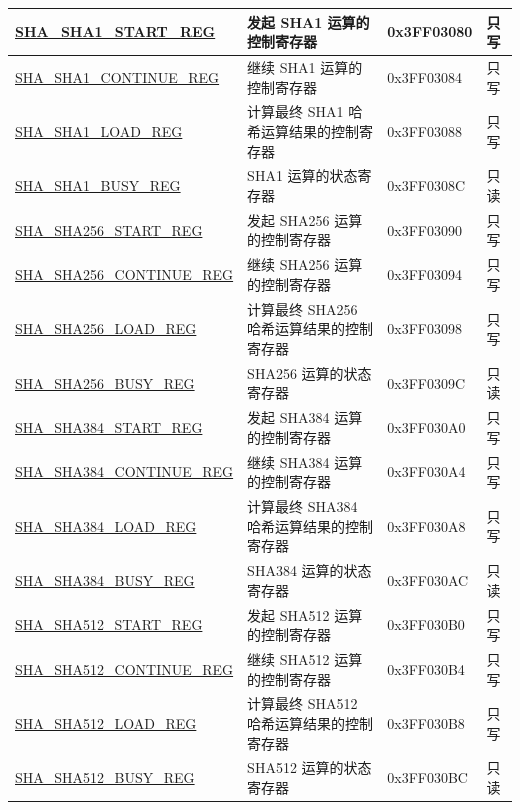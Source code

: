 \begin{longtable}{ | p{5cm} | p{7.2cm} | p{1.9cm} | p{0.9cm} | }
\hyperref[regdesc:SHASHA1STARTREG]{SHA\_SHA1\_START\_REG} & 发起 SHA1 运算的控制寄存器 & 0x3FF03080 & 只写 \\ \hline
\hyperref[regdesc:SHASHA1CONTINUEREG]{SHA\_SHA1\_CONTINUE\_REG} & 继续 SHA1 运算的控制寄存器 & 0x3FF03084 & 只写 \\ \hline
\hyperref[regdesc:SHASHA1LOADREG]{SHA\_SHA1\_LOAD\_REG} & 计算最终 SHA1 哈希运算结果的控制寄存器 & 0x3FF03088 & 只写 \\ \hline
\hyperref[regdesc:SHASHA1BUSYREG]{SHA\_SHA1\_BUSY\_REG} & SHA1 运算的状态寄存器 & 0x3FF0308C & 只读 \\ \hline
\hyperref[regdesc:SHASHA256STARTREG]{SHA\_SHA256\_START\_REG} & 发起 SHA256 运算的控制寄存器 & 0x3FF03090 & 只写 \\ \hline
\hyperref[regdesc:SHASHA256CONTINUEREG]{SHA\_SHA256\_CONTINUE\_REG} & 继续 SHA256 运算的控制寄存器 & 0x3FF03094 & 只写 \\ \hline
\hyperref[regdesc:SHASHA256LOADREG]{SHA\_SHA256\_LOAD\_REG} & 计算最终 SHA256 哈希运算结果的控制寄存器 & {0x3FF03098} & 只写 \\ \hline
\hyperref[regdesc:SHASHA256BUSYREG]{SHA\_SHA256\_BUSY\_REG} & SHA256 运算的状态寄存器 & 0x3FF0309C & 只读 \\ \hline
\hyperref[regdesc:SHASHA384STARTREG]{SHA\_SHA384\_START\_REG} & 发起 SHA384 运算的控制寄存器 & 0x3FF030A0 & 只写 \\ \hline
\hyperref[regdesc:SHASHA384CONTINUEREG]{SHA\_SHA384\_CONTINUE\_REG} & 继续 SHA384 运算的控制寄存器 & 0x3FF030A4 & 只写 \\ \hline
{\hyperref[regdesc:SHASHA384LOADREG]{SHA\_SHA384\_LOAD\_REG}} & 计算最终 SHA384 哈希运算结果的控制寄存器 & {0x3FF030A8} & 只写 \\ \hline
\hyperref[regdesc:SHASHA384BUSYREG]{SHA\_SHA384\_BUSY\_REG} & SHA384 运算的状态寄存器 & 0x3FF030AC & 只读 \\ \hline
\hyperref[regdesc:SHASHA512STARTREG]{SHA\_SHA512\_START\_REG} & 发起 SHA512 运算的控制寄存器 & 0x3FF030B0 & 只写 \\ \hline
\hyperref[regdesc:SHASHA512CONTINUEREG]{SHA\_SHA512\_CONTINUE\_REG} & 继续 SHA512 运算的控制寄存器 & 0x3FF030B4 & 只写 \\ \hline
{\hyperref[regdesc:SHASHA512LOADREG]{SHA\_SHA512\_LOAD\_REG}} & 计算最终 SHA512 哈希运算结果的控制寄存器 & {0x3FF030B8} & 只写 \\ \hline
\hyperref[regdesc:SHASHA512BUSYREG]{SHA\_SHA512\_BUSY\_REG} & SHA512 运算的状态寄存器 & 0x3FF030BC & 只读 \\ \hline
\end{longtable}